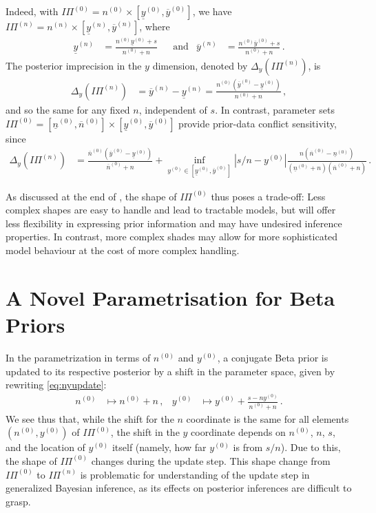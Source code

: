 \documentclass[runningheads,a4paper]{llncs}
\newcommand{\uz}{^{(0)}} %
\newcommand{\un}{^{(n)}} %
\newcommand{\ul}[1]{\underline{#1}}
\newcommand{\ol}[1]{\overline{#1}}
\def\yz{y\uz}
\def\yn{y\un}
\def\yzl{\ul{y}\uz}
\def\yzu{\ol{y}\uz}
\def\ynl{\ul{y}\un}
\def\ynu{\ol{y}\un}
\def\nz{n\uz}
\def\nn{n\un}
\def\nzl{\ul{n}\uz}
\def\nzu{\ol{n}\uz}
\def\PZ{I\!\!\Pi\uz}
\def\PN{I\!\!\Pi\un}
\begin{document}
Indeed, with $\PZ = \nz \times [\yzl, \yzu]$, we have $\PN = \nn \times [\ynl, \ynu]$, where
\begin{align*}
\ynl &= \frac{\nz\yzl + s}{\nz + n} & &\text{and} &
\ynu &= \frac{\nz\yzu + s}{\nz + n}\,.
\end{align*}
The posterior imprecision in the $y$ dimension, denoted by $\Delta_y(\PN)$, is 
\begin{align*}
\Delta_y(\PN) &= \ynu - \ynl = \frac{\nz (\yzu - \yzl)}{\nz +n}\,,
\end{align*}
and so the same for any fixed $n$, independent of $s$.
In contrast, parameter sets $\PZ = [\nzl, \nzu] \times [\yzl, \yzu]$
provide prior-data conflict sensitivity, since
\begin{align*}
\Delta_y(\PN) &= \frac{\nzu (\yzu - \yzl)}{\nzu + n} %
               + \inf_{\yz \in [\yzl,\yzu]} |s/n - \yz| \frac{n (\nzu - \nzl)}{(\nzl + n)(\nzu + n)}\,.
\end{align*}

As discussed at the end of \cite[\S 3.1.4]{2013:diss-gw},
the shape of $\PZ$ thus poses a trade-off:
Less complex shapes are easy to handle and lead to tractable models,
but will offer less flexibility in expressing prior information
and may have undesired inference properties.
In contrast, more complex shades may allow for more sophisticated model behaviour
at the cost of more complex handling.


\section{A Novel Parametrisation for Beta Priors}
\label{sec:miksworld}

In the parametrization in terms of $\nz$ and $\yz$, %
a conjugate Beta prior is updated to its respective posterior by a shift in the parameter space,
given by rewriting \eqref{eq:nyupdate}:
\begin{align*}
\nz &\mapsto \nz + n\,, &
\yz &\mapsto %
             \yz + \frac{s - n \yz}{\nz+n}\,.
\end{align*}
We see thus that, while the shift for the $n$ coordinate is the same for all elements $(\nz,\yz)$ of $\PZ$,
the shift in the $y$ coordinate depends on $\nz$, $n$, $s$, and the location of $\yz$ itself
(namely, how far $\yz$ is from $s/n$).
Due to this, the shape of $\PZ$ changes during the update step.
This shape change from $\PZ$ to $\PN$ is problematic for understanding of the update step in generalized Bayesian inference,
as its effects on posterior inferences are difficult to grasp.
\end{document}
